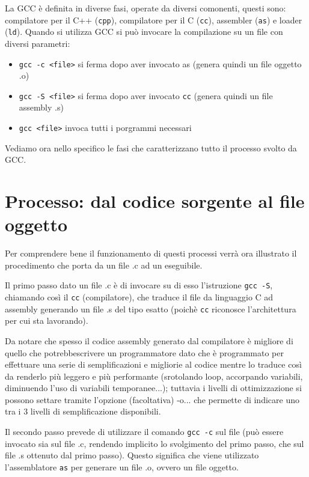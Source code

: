 \documentclass[class=book, crop=false, oneside]{standalone}
\begin{document}
La GCC è definita in diverse fasi, operate da diversi comonenti, questi sono: compilatore per il C++ (\texttt{cpp}), compilatore per il C (\texttt{cc}), assembler (\texttt{as}) e loader (\texttt{ld}).
Quando si utilizza GCC si può invocare la compilazione su un file con diversi parametri:
\begin{itemize}
	\item \texttt{gcc -c <file>} si ferma dopo aver invocato as (genera quindi un file oggetto .o)
	\item \texttt{gcc -S <file>} si ferma dopo aver invocato \texttt{cc} (genera quindi un file assembly .s)
	\item \texttt{gcc <file>} invoca tutti i porgrammi necessari
\end{itemize}
Vediamo ora nello specifico le fasi che caratterizzano tutto il processo svolto da GCC.

\section{Processo: dal codice sorgente al file oggetto}
Per comprendere bene il funzionamento di questi processi verrà ora illustrato il procedimento che porta da un file .c ad un eseguibile.

Il primo passo dato un file .c è di invocare su di esso l'istruzione \texttt{gcc -S}, chiamando così il \texttt{cc} (compilatore), che traduce il file da linguaggio C ad assembly generando un file .s del tipo esatto (poichè \texttt{cc} riconosce l'architettura per cui sta lavorando).

Da notare che spesso il codice assembly generato dal compilatore è migliore di quello che potrebbescrivere un programmatore dato che è programmato per effettuare una serie di semplificazioni e migliorie al codice mentre lo traduce così da renderlo più leggero e più performante (srotolando loop, accorpando variabili, diminuendo l'uso di variabili temporanee...); tuttavia i livelli di ottimizzazione si possono settare tramite l'opzione (facoltativa) -o... che permette di indicare uno tra i 3 livelli di semplificazione disponibili.

Il secondo passo prevede di utilizzare il comando \texttt{gcc -c} sul file (può essere invocato sia sul file .c, rendendo implicito lo svolgimento del primo passo, che sul file .s ottenuto dal primo passo). Questo significa che viene utilizzato l'assemblatore \texttt{as} per generare un file .o, ovvero un file oggetto.
\end{document}
